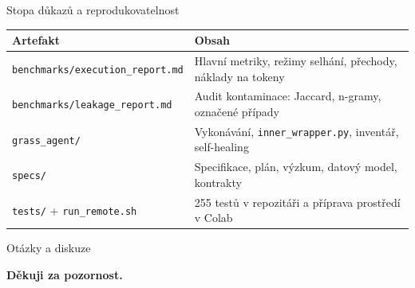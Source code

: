 \documentclass[aspectratio=169,10pt]{beamer}
\begin{document}
\begin{frame}[t]{Stopa důkazů a reprodukovatelnost}
  \small
  \begin{table}
    \centering
    \footnotesize
    \begin{tabular}{@{}p{5.0cm}p{8.0cm}@{}}
      \toprule
      \textbf{Artefakt} & \textbf{Obsah} \\
      \midrule
      \texttt{benchmarks/execution\_report.md}
        & Hlavní metriky, režimy selhání, přechody, náklady na tokeny \\
      \texttt{benchmarks/leakage\_report.md}
        & Audit kontaminace: Jaccard, n-gramy, označené případy \\
      \texttt{grass\_agent/}
        & Vykonávání, \texttt{inner\_wrapper.py}, inventář, self-healing \\
      \texttt{specs/}
        & Specifikace, plán, výzkum, datový model, kontrakty \\
      \texttt{tests/} + \texttt{run\_remote.sh}
        & 255 testů v repozitáři a příprava prostředí v Colab \\
      \bottomrule
    \end{tabular}
  \end{table}

\end{frame}

\begin{frame}[t]{Otázky a diskuze}

  \vspace{6mm}
  \begin{center}
    \Large\color{grassdark}\textbf{Děkuji za pozornost.}
  \end{center}
\end{frame}
\end{document}
